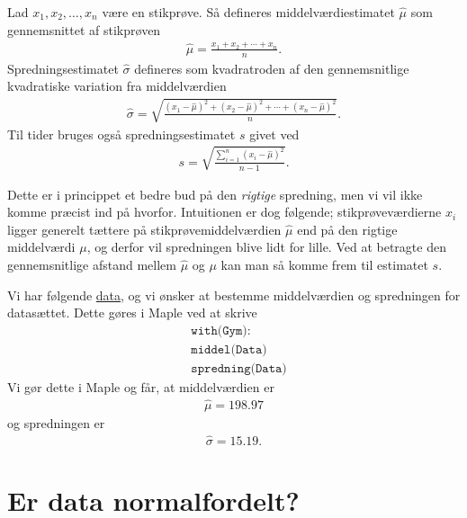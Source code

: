 \begin{defn}
Lad $x_1,x_2,\hdots, x_n$ være en stikprøve. Så defineres middelværdiestimatet $\hat{\mu}$ som gennemsnittet af stikprøven
\begin{align*}
	\hat{\mu} = \frac{x_1+x_2+\cdots+x_n}{n}.
\end{align*}
Spredningsestimatet $\hat{\sigma}$ defineres som kvadratroden af den gennemsnitlige kvadratiske variation fra middelværdien
\begin{align*}
	\hat{\sigma} = \sqrt{\frac{(x_1-\hat{\mu})^2 + (x_2 - \hat{\mu})^2+\cdots + (x_n-\hat{\mu})^2}{n}}. 
\end{align*}
Til tider bruges også spredningsestimatet $s$ givet ved
\begin{align*}
	s = \sqrt{\frac{\sum_{i=1}^n\left({x_i - \hat{\mu}}\right)^2}{n-1}}.
\end{align*}
\end{defn}
Dette er i princippet et bedre bud på den \textit{rigtige} spredning, men vi vil ikke komme præcist ind på hvorfor. Intuitionen er dog følgende; stikprøveværdierne $x_i$ ligger generelt tættere på stikprøvemiddelværdien $\hat{\mu}$ end på den rigtige middelværdi $\mu$, og derfor vil spredningen blive lidt for lille. Ved at betragte den gennemsnitlige afstand mellem $\hat{\mu}$ og $\mu$ kan man så komme frem til estimatet $s$. 
\begin{exa}
Vi har følgende \href{https://github.com/ChristianJLex/TeachingNotes/raw/master/2022-2023/Data%20og%20lign/data.xlsx}{\color{blue!60}data}, og vi ønsker at bestemme middelværdien og spredningen for datasættet. Dette gøres i Maple ved at skrive
\begin{align*}
	&\texttt{with(Gym):}\\
	&\texttt{middel(Data)}\\
	&\texttt{spredning(Data)}
\end{align*} 
Vi gør dette i Maple og får, at middelværdien er
\begin{align*}
	\hat{\mu} = 198.97
\end{align*}
og spredningen er 
\begin{align*}
	\hat{\sigma} = 15.19.
\end{align*}
\end{exa}

\section*{Er data normalfordelt?}

